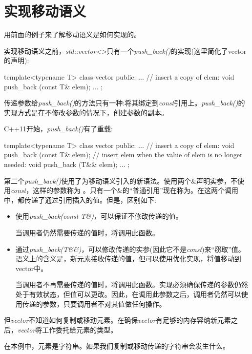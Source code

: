 \section{实现移动语义}
用前面的例子来了解移动语义是如何实现的。

实现移动语义之前，\textit{std::vector<>}只有一个\textit{push_back()}的实现(这里简化了vector的声明):

\begin{cppcode}
template<typename T>
class vector {
	public:
	...
	// insert a copy of elem:
	void push_back (const T& elem);
	...
};
\end{cppcode}

传递参数给\textit{push_back()}的方法只有一种:将其绑定到\textit{const}引用上。\textit{push_back()}的实现方式是在不修改参数的情况下，创建参数的副本。

C++11开始，\textit{push_back()}有了重载:

\begin{cppcode}
template<typename T>
class vector {
	public:
	...
	// insert a copy of elem:
	void push_back (const T& elem);
	// insert elem when the value of elem is no longer needed:
	void push_back (T&& elem);
	...
};
\end{cppcode}

第二个\textit{push_back()}使用了为移动语义引入的新语法。使用两个\&声明实参，不使用\textit{const}，这样的参数称为 。只有一个\&的“普通引用”现在称为。在这两个调用中，都传递了通过引用插入的值。但是，区别如下:

\begin{itemize}
	\item 使用\textit{push_back(const T\&)}，可以保证不修改传递的值。

	当调用者仍然需要传递的值时，将调用此函数。
	\item 通过\textit{push_back(T\&\&)}，可以修改传递的实参(因此它不是\textit{const})来“窃取”值。语义上的含义是，新元素接收传递的值，但可以使用优化实现，将值移动到vector中。

	当调用者不再需要传递的值时，将调用此函数。实现必须确保传递的参数仍然处于有效状态，但值可以更改。因此，在调用此参数之后，调用者仍然可以使用传递的参数，只要调用者不对其值做任何操作。
\end{itemize}

但\textit{vector}不知道如何复制或移动元素。在确保\textit{vector}有足够的内存容纳新元素之后，\textit{vector}将工作委托给元素的类型。

在本例中，元素是字符串。如果我们复制或移动传递的字符串会发生什么。

